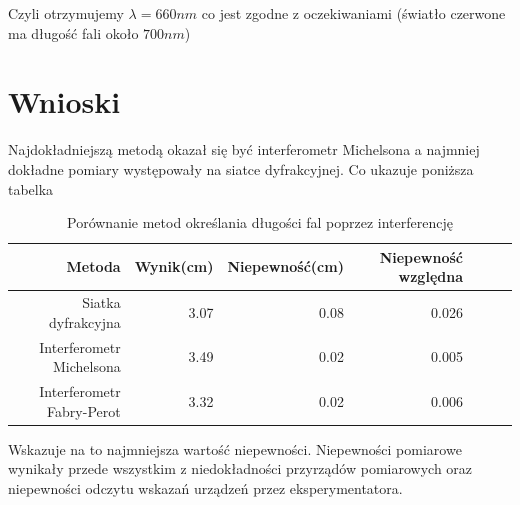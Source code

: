 \documentclass[a4paper]{article}
\begin{document}
Czyli otrzymujemy $\lambda = 660nm$ co jest zgodne z oczekiwaniami (światło czerwone ma długość fali około $700 nm$)


\section{Wnioski}
Najdokładniejszą metodą okazał się być interferometr Michelsona a najmniej dokładne pomiary występowały na siatce dyfrakcyjnej. Co ukazuje poniższa tabelka

\begin{table}[h!]
\centering
\begin{tabular}{rrrrrrr}
\toprule
Metoda & Wynik(cm) & Niepewność(cm) & Niepewność względna\\
\midrule
Siatka dyfrakcyjna & 3.07 & 0.08 & 0.026\\
Interferometr Michelsona & 3.49 & 0.02 & 0.005\\
Interferometr Fabry-Perot & 3.32 & 0.02 & 0.006\\
\bottomrule
\end{tabular}
\caption{Porównanie metod określania długości fal poprzez interferencję}
\label{porownanie_metod}
\end{table}

Wskazuje na to najmniejsza wartość niepewności. Niepewności pomiarowe wynikały przede
wszystkim z niedokładności przyrządów pomiarowych oraz niepewności odczytu wskazań urządzeń
przez eksperymentatora.
\end{document}
